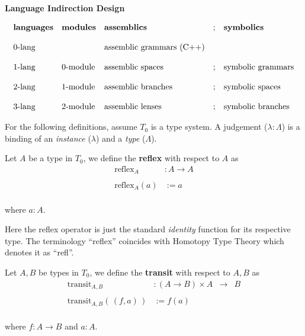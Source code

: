\documentclass[twoside]{article}
\newenvironment{definition}[1][Definition]{\begin{trivlist}
\item[\hskip \labelsep {\bfseries Definition (#1):}]}{\end{trivlist}}
\begin{document}
\vspace{0.5cm}

\begin{center}
\bf Language Indirection Design
\end{center}

$$ \begin{array}{lllll}
\mbox{\bf languages}	& \mbox{\bf modules}	& \mbox{\bf assemblics}			& \mbox{;}	& \mbox{\bf symbolics}		\\
																	\\
0\mbox{-lang}		& 			& \mbox{assemblic grammars (C++)}							\\
																	\\
1\mbox{-lang}		& 0\mbox{-module}	& \mbox{assemblic spaces}		& \mbox{;}	& \mbox{symbolic grammars}	\\
																	\\
2\mbox{-lang}		& 1\mbox{-module}	& \mbox{assemblic branches}		& \mbox{;}	& \mbox{symbolic spaces}	\\
																	\\
3\mbox{-lang}		& 2\mbox{-module}	& \mbox{assemblic lenses}		& \mbox{;}	& \mbox{symbolic branches}	\\
\end{array} $$

\vspace{0.5cm}

For the following definitions, assume $ T_0 $ is a type system. A judgement ($ \lambda : \Lambda $)
is a binding of an \emph{instance} ($ \lambda $) and a \emph{type} ($ \Lambda $).

\begin{definition}[compositional reflexivity]
Let $ A $ be a type in $ T_0 $, we define the {\bf reflex} with respect to $ A $ as
$$ \begin{array}{rl}
\mbox{reflex}_A		& : A\to A		\\
						\\
\mbox{reflex}_A(a)	& := a			\\
\end{array} $$

where $ a:A $.
\end{definition}

Here the reflex operator is just the standard \emph{identity} function for its respective type.
The terminology ``reflex'' coincides with Homotopy Type Theory which denotes it as ``refl''.\\[0.5cm]

\begin{definition}[compositional transitivity]
Let $ A, B $ be types in $ T_0 $,
we define the {\bf transit} with respect to $ A, B $ as
$$ \begin{array}{rllcl}
\mbox{transit}_{A, B}			& : (A\to B)\times A	& \to	& B		\\
											\\
\mbox{transit}_{A, B}(\,(f,a)\,)	& := f(a)					\\
\end{array} $$

where $ f:A\to B $ and $ a:A $.
\end{definition}
\end{document}
